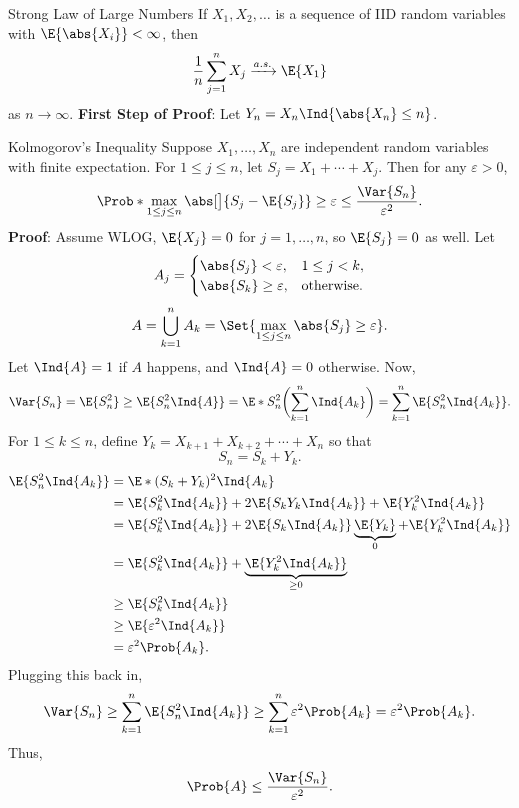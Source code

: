\begin{Theorem}{Strong Law of Large Numbers}{}
    If $ X_1,X_2,\ldots $ is a sequence of IID random variables with
    $ \E{\abs{X_i}}<\infty $, then
    \[ \frac{1}{n}\sum_{j=1}^{n}X_j\as \E{X_1} \]
    as $ n\to\infty $.
    \tcblower{}
    \textbf{First Step of Proof}:
    Let $ Y_n=X_n\Ind{\abs{X_n}\le n} $.
\end{Theorem}
\begin{Theorem}{Kolmogorov's Inequality}{}
    Suppose $ X_1,\ldots,X_n $ are independent random variables
    with finite expectation. For $ 1\le j\le n $,
    let $ S_j=X_1+\cdots+X_j $. Then for any $ \varepsilon>0 $,
    \[ \Prob*{\operatorname*{max}_{1\le j\le n}\abs[\big]{S_j-\E{S_j}}\ge \varepsilon}\le
        \frac{\Var{S_n}}{\varepsilon^2}. \]
    \tcblower{}
    \textbf{Proof}: Assume WLOG, $ \E{X_j}=0 $ for $ j=1,\ldots,n $,
    so $ \E{S_j}=0 $ as well. Let
    \[ A_j=\begin{cases}
            \abs{S_j}<\varepsilon,    & 1\le j<k,         \\
            \abs{S_k}\ge \varepsilon, & \text{otherwise}.
        \end{cases} \]
    \[ A=\bigcup_{k=1}^n A_k=\Set{\operatorname*{max}_{1\le j\le n}\abs{S_j}\ge \varepsilon}. \]
    Let $ \Ind{A}=1 $ if $ A $ happens, and $\Ind{A}=0$ otherwise.
    Now,
    \[ \Var{S_n}=\E{S_n^2}\ge \E{S_n^2\Ind{A}}=\E*{S_n^2\biggl(\sum_{k=1}^{n}\Ind{A_k}\biggr)}=\sum_{k=1}^{n}\E{S_n^2\Ind{A_k}}. \]
    For $ 1\le k\le n $, define $ Y_k=X_{k+1}+X_{k+2}+\cdots+X_n $ so that
    \[ S_n=S_k+Y_k. \]
    \begin{align*}
        \E{S_n^2\Ind{A_k}}
         & =\E*{(S_k+Y_k)^2\Ind{A_k}}                                                       \\
         & =\E{S_k^2\Ind{A_k}}+2\E{S_k Y_k\Ind{A_k}}+\E{Y_k^2\Ind{A_k}}                     \\
         & =\E{S_k^2\Ind{A_k}}+2\E{S_k\Ind{A_k}}\underbrace{\E{Y_k}}_{0}+\E{Y_k^2\Ind{A_k}} \\
         & =\E{S_k^2\Ind{A_k}}+\underbrace{\E{Y_k^2\Ind{A_k}}}_{\ge 0}                      \\
         & \ge \E{S_k^2\Ind{A_k}}                                                           \\
         & \ge \E{\varepsilon^2\Ind{A_k}}                                                   \\
         & =\varepsilon^2\Prob{A_k}.
    \end{align*}
    Plugging this back in,
    \[ \Var{S_n}\ge \sum_{k=1}^{n}\E{S_n^2\Ind{A_k}}
        \ge \sum_{k=1}^{n}\varepsilon^2\Prob{A_k}
        =\varepsilon^2\Prob{A_k}. \]
    Thus,
    \[ \Prob{A}\le \frac{\Var{S_n}}{\varepsilon^2}. \]
\end{Theorem}
